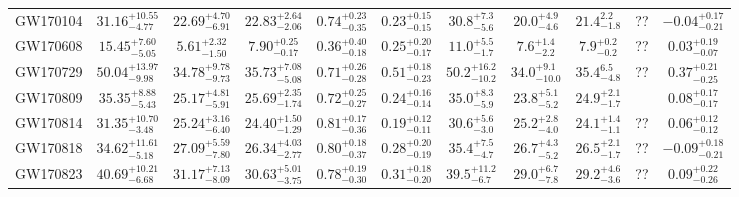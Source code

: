 \begin{table}[]
\begin{tabular}{cccccc|ccccc}
\multicolumn{1}{c|}{GW170104} & $31.16_{-4.77}^{+10.55}$& $22.69_{-6.91}^{+4.70}$& $22.83_{-2.06}^{+2.64}$& $0.74_{-0.35}^{+0.23}$& $0.23_{-0.15}^{+0.15}$&  $30.8_{-5.6}^{+7.3}$             & $20.0_{-4.6}^{+4.9}$              & $21.4_{-1.8}^{2.2}$                       & ?? & $-0.04_{-0.21}^{+0.17}$             \\
\multicolumn{1}{c|}{GW170608} & $15.45_{-5.05}^{+7.60}$& $5.61_{-1.50}^{+2.32}$& $7.90_{-0.17}^{+0.25}$& $0.36_{-0.18}^{+0.40}$& $0.25_{-0.17}^{+0.20}$&  $11.0_{-1.7}^{+5.5}$             & $7.6_{-2.2}^{+1.4}$              &      $7.9_{-0.2}^{+0.2}$                  & ?? &   $0.03_{-0.07}^{+0.19}$           \\
\multicolumn{1}{c|}{GW170729} & $50.04_{-9.98}^{+13.97}$& $34.78_{-9.73}^{+9.78}$& $35.73_{-5.08}^{+7.08}$& $0.71_{-0.28}^{+0.26}$& $0.51_{-0.23}^{+0.18}$&  $50.2_{-10.2}^{+16.2}$             &  $34.0_{-10.0}^{+9.1}$             & $35.4_{-4.8}^{6.5}$                      & ?? & $0.37_{-0.25}^{+0.21}$              \\
\multicolumn{1}{c|}{GW170809} & $35.35_{-5.43}^{+8.88}$& $25.17_{-5.91}^{+4.81}$& $25.69_{-1.74}^{+2.35}$& $0.72_{-0.27}^{+0.25}$& $0.24_{-0.14}^{+0.16}$&    $35.0_{-5.9}^{+8.3}$           &                 $23.8_{-5.2}^{+5.1}$                     &  $24.9_{-1.7}^{+2.1}$   & & $0.08_{-0.17}^{+0.17}$             \\
\multicolumn{1}{c|}{GW170814}& $31.35_{-3.48}^{+10.70}$& $25.24_{-6.40}^{+3.16}$& $24.40_{-1.29}^{+1.50}$& $0.81_{-0.36}^{+0.17}$& $0.19_{-0.11}^{+0.12}$&  $30.6_{-3.0}^{+5.6}$             &               $25.2_{-4.0}^{+2.8}$&   $24.1_{-1.1}^{+1.4}$                    & ?? &   $0.06_{-0.12}^{+0.12}$           \\
\multicolumn{1}{c|}{GW170818} &$34.62_{-5.18}^{+11.61}$& $27.09_{-7.80}^{+5.59}$& $26.34_{-2.77}^{+4.03}$& $0.80_{-0.37}^{+0.18}$& $0.28_{-0.19}^{+0.20}$&   $35.4_{-4.7}^{+7.5}$            &               $26.7_{-5.2}^{+4.3}$& $26.5_{-1.7}^{+2.1}$                      & ?? &  $-0.09_{-0.21}^{+0.18}$            \\
\multicolumn{1}{c|}{GW170823} & $40.69_{-6.68}^{+10.21}$& $31.17_{-8.09}^{+7.13}$& $30.63_{-3.75}^{+5.01}$& $0.78_{-0.30}^{+0.19}$& $0.31_{-0.20}^{+0.18}$&  $39.5_{-6.7}^{+11.2}$             &               $29.0_{-7.8}^{+6.7}$&   $29.2_{-3.6}^{+4.6}$                    & ?? &   $0.09_{-0.26}^{+0.22}$           \\ \hline
\end{tabular}
\end{table}

